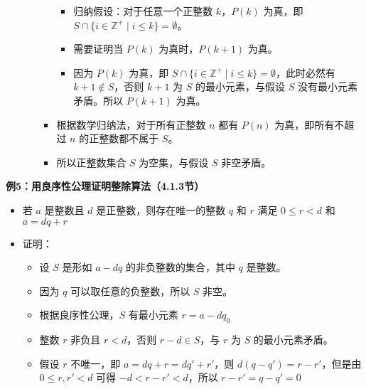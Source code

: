 \documentclass[UTF8]{report}
\theoremstyle{MyLineTheoremStyle} %
\theoremstyle{MyBlockTheoremStyle} %
\theoremstyle{MySubsubsectionStyle} %
\begin{document}
\begin{itemize}
\begin{itemize}
\begin{itemize}
                    \begin{itemize}
                        \item 归纳假设：对于任意一个正整数 $k$，$P(k)$ 为真，即 $S \cap \{i \in \mathbb{Z}^+ \mid i \leq k\} = \emptyset$。
                        \item 需要证明当 $P(k)$ 为真时，$P(k+1)$ 为真。
                        \item 因为 $P(k)$ 为真，即 $S \cap \{i \in \mathbb{Z}^+ \mid i \leq k\} = \emptyset$，此时必然有 $k+1 \notin S$，否则 $k+1$ 为 $S$ 的最小元素，与假设 $S$ 没有最小元素矛盾。所以 $P(k+1)$ 为真。
                    \end{itemize}
                    \item 根据数学归纳法，对于所有正整数 $n$ 都有 $P(n)$ 为真，即所有不超过 $n$ 的正整数都不属于 $S$。
                    \item 所以正整数集合 $S$ 为空集，与假设 $S$ 非空矛盾。
                \end{itemize}
            \end{itemize}
        \end{itemize}
        
        \textbf{例5：用良序性公理证明整除算法（4.1.3节）}
        \begin{itemize}
            \item 若 $a$ 是整数且 $d$ 是正整数，则存在唯一的整数 $q$ 和 $r$ 满足 $0 \leq r < d$ 和 $a = dq + r$
            \item 证明：
            \begin{itemize}
                \item 设 $S$ 是形如 $a - dq$ 的非负整数的集合，其中 $q$ 是整数。
                \item 因为 $q$ 可以取任意的负整数，所以 $S$ 非空。
                \item 根据良序性公理，$S$ 有最小元素 $r = a - dq_0$
                \item 整数 $r$ 非负且 $r < d$，否则 $r - d \in S$，与 $r$ 为 $S$ 的最小元素矛盾。
                \item 假设 $r$ 不唯一，即 $a = dq + r = dq' + r'$，则 $d(q - q') = r - r'$，但是由 $0 \leq r, r' < d$ 可得 $-d < r - r' < d$，所以 $r - r' = q - q' = 0$
            \end{itemize}
        \end{itemize}
        
\end{document}
